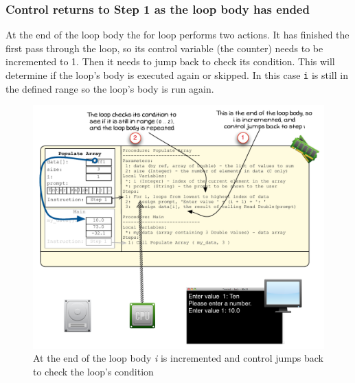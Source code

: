 
\clearpage
\subsubsection{Control returns to Step 1 as the loop body has ended} %
\label{ssub:control_returns_to_step_1_as_the_loop_body_has_ended}

At the end of the loop body the for loop performs two actions. It has finished the first pass through the loop, so its control variable (the counter) needs to be incremented to 1. Then it needs to jump back to check its condition. This will determine if the loop's body is executed again or skipped. In this case \texttt{i} is still in the defined range so the loop's body is run again.

\begin{figure}[htbp]
   \centering
   \includegraphics[width=\textwidth]{./topics/arrays/images/PopulateArray6} 
   \caption{At the end of the loop body \emph{i} is incremented and control jumps back to check the loop's condition}
   \label{fig:populate-array-vis-6}
\end{figure}


